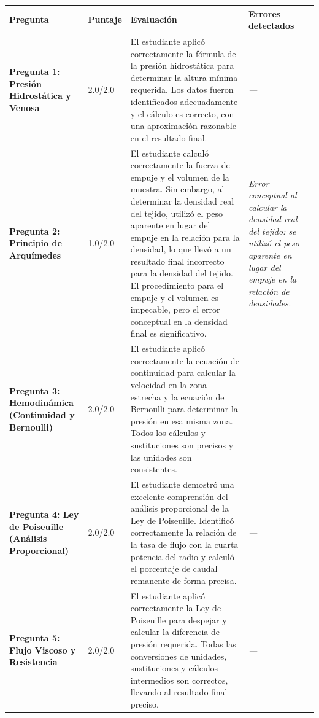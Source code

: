 \documentclass[11pt,a4paper]{article}
\begin{document}
\begin{longtable}{>{\bfseries}p{2.8cm} p{1.6cm} p{7.0cm} p{2.8cm}}
  \toprule
  \textbf{Pregunta} & \textbf{Puntaje} & \textbf{Evaluación} & \textbf{Errores detectados} \\
  \midrule
  \endhead
  \bottomrule
  \endfoot
    \textbf{Pregunta 1: Presión Hidrostática y Venosa} & 2.0/2.0 & El estudiante aplicó correctamente la fórmula de la presión hidrostática para determinar la altura mínima requerida. Los datos fueron identificados adecuadamente y el cálculo es correcto, con una aproximación razonable en el resultado final. & \textit{---} \\
    \midrule
    \textbf{Pregunta 2: Principio de Arquímedes} & 1.0/2.0 & El estudiante calculó correctamente la fuerza de empuje y el volumen de la muestra. Sin embargo, al determinar la densidad real del tejido, utilizó el peso aparente en lugar del empuje en la relación para la densidad, lo que llevó a un resultado final incorrecto para la densidad del tejido. El procedimiento para el empuje y el volumen es impecable, pero el error conceptual en la densidad final es significativo. & \textit{Error conceptual al calcular la densidad real del tejido: se utilizó el peso aparente en lugar del empuje en la relación de densidades.} \\
    \midrule
    \textbf{Pregunta 3: Hemodinámica (Continuidad y Bernoulli)} & 2.0/2.0 & El estudiante aplicó correctamente la ecuación de continuidad para calcular la velocidad en la zona estrecha y la ecuación de Bernoulli para determinar la presión en esa misma zona. Todos los cálculos y sustituciones son precisos y las unidades son consistentes. & \textit{---} \\
    \midrule
    \textbf{Pregunta 4: Ley de Poiseuille (Análisis Proporcional)} & 2.0/2.0 & El estudiante demostró una excelente comprensión del análisis proporcional de la Ley de Poiseuille. Identificó correctamente la relación de la tasa de flujo con la cuarta potencia del radio y calculó el porcentaje de caudal remanente de forma precisa. & \textit{---} \\
    \midrule
    \textbf{Pregunta 5: Flujo Viscoso y Resistencia} & 2.0/2.0 & El estudiante aplicó correctamente la Ley de Poiseuille para despejar y calcular la diferencia de presión requerida. Todas las conversiones de unidades, sustituciones y cálculos intermedios son correctos, llevando al resultado final preciso. & \textit{---} \\
    \midrule
\end{longtable}
\end{document}
